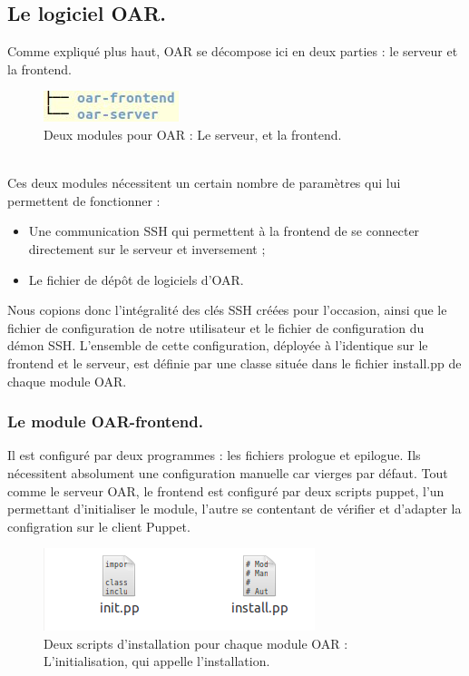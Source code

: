 \documentclass[a4paper,10pt]{article}
\begin{document}
			\subsection{Le logiciel OAR.}
			Comme expliqué plus haut, OAR se décompose ici en deux parties : le serveur et la frontend. 
		\begin{figure}[!h]
			\centering
			\includegraphics[scale=0.8]{modoar.jpg}
			\caption{Deux modules pour OAR : Le serveur, et la frontend.}	
			\label{OAR Server et OAR Frontend.}
		\end{figure}
			\\Ces deux modules nécessitent un certain nombre de paramètres qui lui permettent de fonctionner :
				\begin{itemize}
					\item Une communication SSH qui permettent à la frontend de se connecter directement sur le serveur et inversement ;
					\item Le fichier de dép\^ot de logiciels d'OAR.
				\end{itemize}
				Nous copions donc l'intégralité des clés SSH créées pour l'occasion, ainsi que le fichier de configuration de notre utilisateur et le fichier de configuration du démon SSH.	
				L'ensemble de cette configuration, déployée à l'identique sur le frontend et le serveur, est définie par une classe située dans le fichier install.pp de chaque module OAR. 

			\subsubsection{Le module OAR-frontend.}
			Il est configuré par deux programmes : les fichiers prologue et epilogue. Ils nécessitent absolument une configuration manuelle car vierges par défaut.
			Tout comme le serveur OAR, le frontend est configuré par deux scripts puppet, l'un permettant d'initialiser le module, l'autre se contentant de vérifier et d'adapter la configration sur le client Puppet.
		\begin{figure}[!h]
			\centering
			\includegraphics[scale=0.7]{fich_ins.png}
			\caption{Deux scripts d'installation pour chaque module OAR : L'initialisation, qui appelle l'installation.}
			\label{Installation OAR}
		\end{figure}
\end{document}
